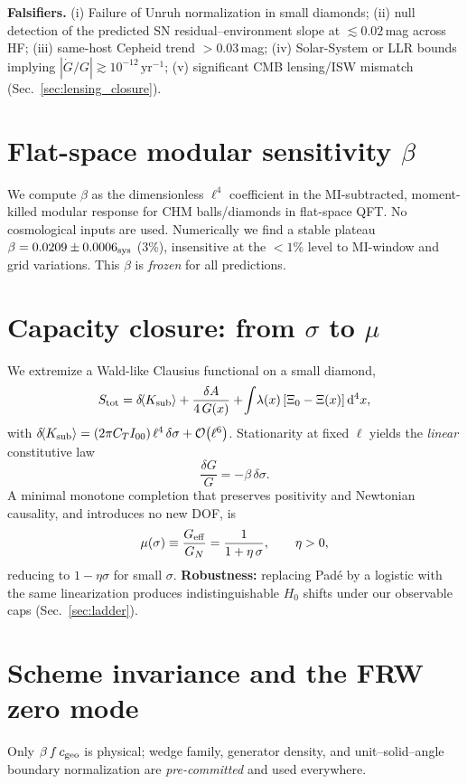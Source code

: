 \documentclass[aps,prd,preprint,onecolumn,longbibliography,nofootinbib]{revtex4-2}
\theoremstyle{plain}
\theoremstyle{remark}
\newcommand{\be}{\beta}
\newcommand{\dd}{\mathrm{d}}
\newcommand{\order}[1]{\mathcal{O}\!\left(#1\right)}
\newcommand{\Geff}{G_{\rm eff}}
\begin{document}
\textbf{Falsifiers.} (i) Failure of Unruh normalization in small diamonds; (ii) null detection of the predicted SN residual–environment slope at $\lesssim 0.02$\,mag across HF; (iii) same-host Cepheid trend $>0.03$\,mag; (iv) Solar-System or LLR bounds implying $|\dot G/G|\gtrsim 10^{-12}\,\mathrm{yr}^{-1}$; (v) significant CMB lensing/ISW mismatch (Sec.~\ref{sec:lensing_closure}).

\section{Flat-space modular sensitivity \texorpdfstring{$\be$}{beta}}
We compute $\be$ as the dimensionless $\ell^4$ coefficient in the MI-subtracted, moment-killed modular response for CHM balls/diamonds in flat-space QFT. No cosmological inputs are used. Numerically we find a stable plateau $\be=0.0209\pm 0.0006_{\rm sys}$ (3\%), insensitive at the $<1\%$ level to MI-window and grid variations. This $\be$ is \emph{frozen} for all predictions.

\section{Capacity closure: from \texorpdfstring{$\sigma$}{sigma} to \texorpdfstring{$\mu$}{mu}}
We extremize a Wald-like Clausius functional on a small diamond,
\begin{equation}
S_{\rm tot}=\delta\!\langle K_{\rm sub}\rangle+\frac{\delta A}{4\,G(x)}+\!\int\!\lambda(x)\,[\Xi_0-\Xi(x)]\,\dd^4x,
\end{equation}
with $\delta\!\langle K_{\rm sub}\rangle=(2\pi C_T I_{00})\,\ell^4\,\delta\sigma + \order{\ell^6}$. Stationarity at fixed $\ell$ yields the \emph{linear} constitutive law
\begin{equation}
\frac{\delta G}{G}=-\be\,\delta\sigma.
\end{equation}
A minimal monotone completion that preserves positivity and Newtonian causality, and introduces no new DOF, is
\begin{equation}
\mu(\sigma)\equiv \frac{\Geff}{G_N}=\frac{1}{1+\eta\,\sigma},\qquad \eta>0,
\end{equation}
reducing to $1-\eta\sigma$ for small $\sigma$. \textbf{Robustness:} replacing Padé by a logistic with the same linearization produces indistinguishable $H_0$ shifts under our observable caps (Sec.~\ref{sec:ladder}).

\section{Scheme invariance and the FRW zero mode}\label{sec:frw_zero}
Only $\be\,f\,c_{\rm geo}$ is physical; wedge family, generator density, and unit–solid–angle boundary normalization are \emph{pre-committed} and used everywhere.
\end{document}
